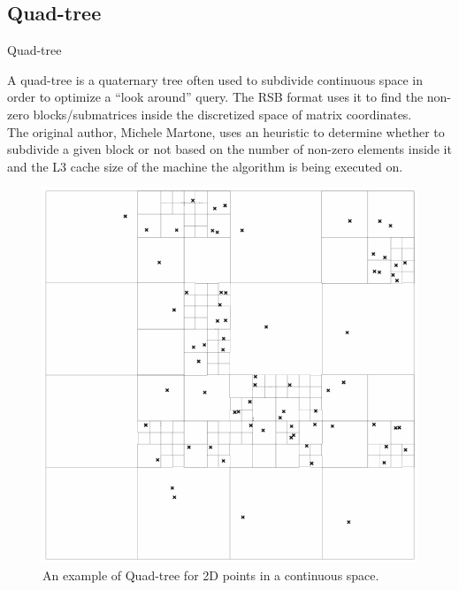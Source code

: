 \documentclass{beamer}
\begin{document}
	\subsection{Quad-tree}
	\begin{frame}{Quad-tree}
		\begin{minipage}{.48\textwidth}
			{\small A quad-tree is a quaternary tree often used to subdivide continuous space in order to optimize a “look around” query. The RSB format uses it to find the non-zero blocks/submatrices inside the discretized space of matrix coordinates.\\
			
			\bigskip
			The original author, Michele Martone, uses an heuristic to determine whether to subdivide a given block or not based on the number of non-zero elements inside it and the L3 cache size of the machine the algorithm is being executed on.}
		\end{minipage}
		\hfill
		\begin{minipage}{.48\textwidth}
			\begin{figure}
				\includegraphics[scale=0.27]{quad-tree}
				\caption*{{\tiny An example of Quad-tree for 2D points in a continuous space.}}
			\end{figure}
		\end{minipage}
	\end{frame}
	
\end{document}
